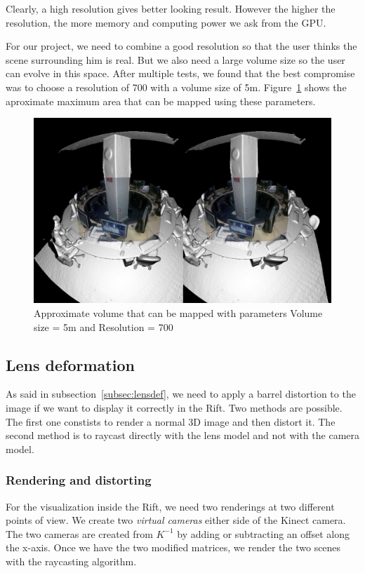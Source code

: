 \documentclass[12pt]{article}
\begin{document}
Clearly, a high resolution gives better looking result. However the higher the resolution, the more memory and computing power we ask from the GPU.

For our project, we need to combine a good resolution so that the user thinks the scene surrounding him is real. But we also need a large volume size so the user can evolve in this space. After multiple tests, we found that the best compromise was to choose a resolution of 700 with a volume size of 5m. Figure~\ref{fig:totalvol} shows the aproximate maximum area that can be mapped using these parameters.

\begin{figure}[h]
  \centering
  \includegraphics[scale=0.3]{TotalVol.png}
  \caption{\label{fig:totalvol} Approximate volume that can be mapped with parameters Volume size = 5m and Resolution = 700}
\end{figure}

\subsection{Lens deformation}
\label{subsec:deformation}
As said in subsection~\ref{subsec:lensdef}, we need to apply a barrel distortion to the image if we want to display it correctly in the Rift. Two methods are possible. The first one constists to render a normal 3D image and then distort it. The second method is to raycast directly with the lens model and not with the camera model.

\subsubsection{Rendering and distorting}
For the visualization inside the Rift, we need two renderings at two different points of view. We create two \textit{virtual cameras} either side of the Kinect camera. The two cameras are created from $K^{-1}$ by adding or subtracting an offset along the x-axis. Once we have the two modified matrices, we render the two scenes with the raycasting algorithm.
\end{document}
